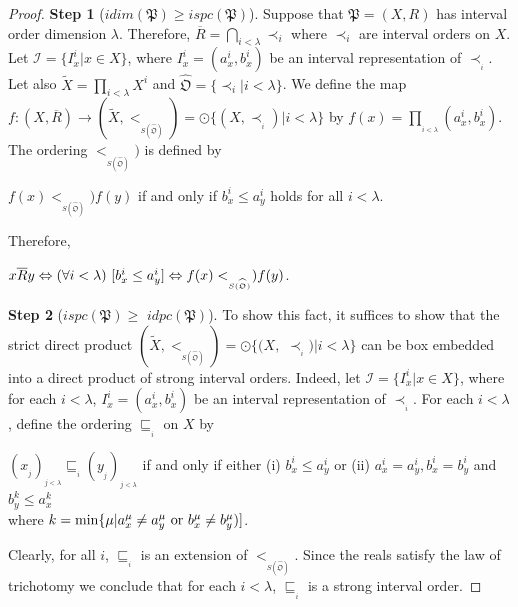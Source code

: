 \documentclass{article}
\theoremstyle{definition}
\begin{document}
\begin{proof}{\bf Step 1} ($idim(\mathfrak{P})\geq ispc(\mathfrak{P})$). Suppose that $\mathfrak{P}=(X,R)$ has interval order dimension $\lambda$. Therefore, 
$\overline{R}=\displaystyle\bigcap_{i<\lambda}\prec_i$ where $\prec_i$ are interval orders
on $X$. Let $\mathcal{I}=\{I_x^i \vert x\in X\}$, where $I_x^i=(a_{x}^{i},b_{x}^{i})$
be an interval representation of $\prec_{_i}$. Let also
$\widetilde{X}=\displaystyle\prod_{i<\lambda}X^i$ and $\widehat{\mathfrak{O}}=\{\prec_{i}\vert i<\lambda\}$.
We define the map $f:(X,\overline{R})\longrightarrow (\widetilde{X},<_{_{S(\widehat{\mathfrak{O}})}})=\odot\{(X,\prec_{_i})\vert i<\lambda\}$ by 
$f(x)=\displaystyle\prod_{_{i<\lambda}} (a_{x}^{i},b_{x}^{i})$.
The ordering $<_{_{S(\widehat{\mathfrak{O}})}})$ is defined by
\begin{center}
$f(x)<_{_{S(\widehat{\mathfrak{O}})}}) f(y)$ if and only if
$b_{x}^{i}\leq a_{y}^{i}$
holds for all $i<\lambda$.
\end{center}
Therefore,
\begin{center}
$x\overline{R}y\Leftrightarrow {\rm (}\forall i<\lambda{\rm )} \ [b_{x}^{i}\leq a_{y}^{i}] \Leftrightarrow f(x) <_{_{S(\widehat{\mathfrak{O}})}}) f(y)$.
\end{center}
\par\smallskip\par\noindent
{\bf Step 2} ($ispc(\mathfrak{P})\geq$ $idpc(\mathfrak{P})$).
To show this fact, it suffices to show that
the strict direct product
$(\widetilde{X},<_{_{S(\widehat{\mathfrak{O}})}})=\odot\{(X,$
$\prec_{_i})\vert i<\lambda\}$ can be box embedded into a direct
product 
of strong interval orders. Indeed,
let $\mathcal{I}=\{I_x^i \vert x\in X\}$, where for each $i<\lambda$,
$I_x^i=(a_{x}^{i},b_{x}^{i})$
be an interval representation of $\prec_{_i}$.
For each $i<\lambda$, define the ordering $\sqsubseteq_{_i}$
on $X$ by 
\begin{center}
$(x_{_j})_{_{j<\lambda}}\sqsubseteq_{_i}(y_{_j})_{_{j<\lambda}}$ if and only if either
(i) $b_{x}^{i}\leq a_{y}^{i}$ or (ii) $a_{x}^{i}=a_{y}^{i}, b_{x}^{i}=b_{y}^{i}$ and $b_{y}^{k}\leq a_{x}^{k}$\\
where 
$k=\min\{\mu\vert a_{x}^{\mu}\neq a_{y}^{\mu}\ {\rm or}\ b_{x}^{\mu}\neq b_{y}^{\mu})]$.
\end{center}
Clearly, for all $i$, $\sqsubseteq_{_i}$ is an extension of $<_{_{S(\widehat{\mathfrak{O}})}}$.
Since the reals satisfy the law of trichotomy we conclude that for each
$i<\lambda$, $\sqsubseteq_{_i}$ is a strong interval order.

\end{proof}
\end{document}
